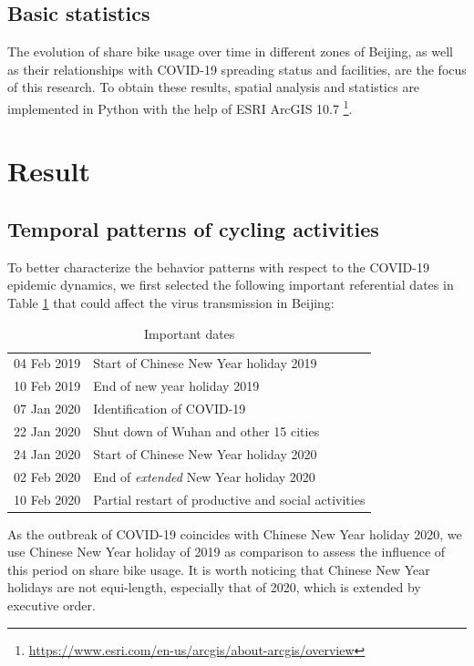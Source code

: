 \documentclass[preprints,ijgi,submit,moreauthors]{Definitions/mdpi}
\begin{document}
\subsection{Basic statistics}
The evolution of share bike usage over time in different zones of Beijing, as well as their relationships with COVID-19 spreading status and facilities, are the focus of this research.
To obtain these results, spatial analysis and statistics are implemented in Python with the help of ESRI ArcGIS 10.7 \footnote{\url{https://www.esri.com/en-us/arcgis/about-arcgis/overview}}. 

\section{Result}

\subsection{Temporal patterns of cycling activities}
To better characterize the behavior patterns with respect to the COVID-19 epidemic dynamics, we first selected the following important referential dates in Table \ref{tab:important_dates} that could affect the virus transmission in Beijing: 

\begin{table}[ht]
    \centering
    \begin{tabular}{ll}
    04 Feb 2019 & Start of Chinese New Year holiday 2019\\
    10 Feb 2019 & End of new year holiday 2019\\
    07 Jan 2020 & Identification of COVID-19\\
    22 Jan 2020 & Shut down of Wuhan and other 15 cities\\
    24 Jan 2020 & Start of Chinese New Year holiday 2020\\
    02 Feb 2020 & End of \textit{extended} New Year holiday 2020\\
    10 Feb 2020 & Partial restart of productive and social activities
    \end{tabular}
    \caption{Important dates}
    \label{tab:important_dates}
\end{table}

As the outbreak of COVID-19 coincides with Chinese New Year holiday 2020, we use Chinese New Year holiday of 2019 as comparison to assess the influence of this period on share bike usage.
It is worth noticing that Chinese New Year holidays are not equi-length, especially that of 2020, which is extended by executive order.
\end{document}
